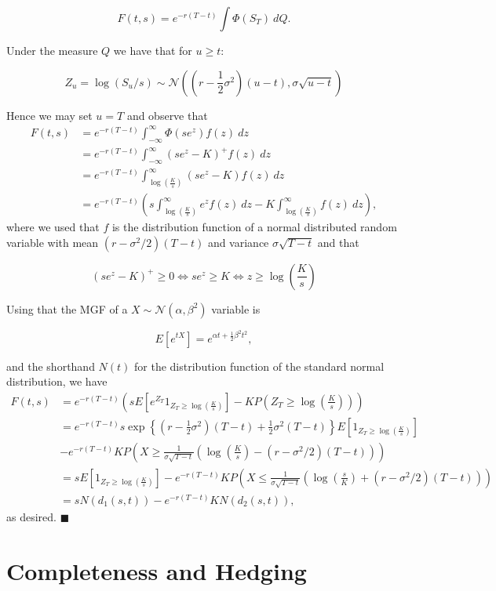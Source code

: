 \documentclass[a4paper,12pt,openany]{book}
\begin{document}
\[
F(t,s)=e^{-r(T-t)}\int \Phi(S_T)\ dQ.
\]

Under the measure \(Q\) we have that for \(u\ge t\):

\[
Z_u=\log (S_u/s)\sim \mathcal{N}\left(\left(r-\frac{1}{2}\sigma^2\right)(u-t),\sigma\sqrt{u-t}\right)
\]

Hence we may set \(u=T\) and observe that
\begin{align*}
F(t,s)&=e^{-r(T-t)}\int_{-\infty}^\infty \Phi(se^z) f(z)\ dz\\
&=e^{-r(T-t)}\int_{-\infty}^\infty (se^z-K)^+ f(z)\ dz\\
&=e^{-r(T-t)}\int_{\log\left(\frac{K}{s}\right)}^{\infty} (se^z-K) f(z)\ dz\\
&=e^{-r(T-t)}\left(s\int_{\log\left(\frac{K}{s}\right)}^{\infty} e^z f(z)\ dz-K\int_{\log\left(\frac{K}{s}\right)}^{\infty} f(z)\ dz\right),
\end{align*}
where we used that \(f\) is the distribution function of a normal distributed random variable with mean \((r-\sigma^2/2)(T-t)\) and variance \(\sigma\sqrt{T-t}\) and that

\[
(se^z-K)^+ \ge 0\iff se^z\ge K\iff z\ge \log\left(\frac{K}{s}\right)
\]

Using that the MGF of a \(X\sim\mathcal{N}(\alpha, \beta^2)\) variable is

\[
E[e^{tX}]=e^{\alpha t+\frac{1}{2}\beta ^2t^2},
\]

and the shorthand \(N(t)\) for the distribution function of the standard normal distribution, we have
\begin{align*}
F(t,s)&=e^{-r(T-t)}\left(sE\left[e^{Z_T}1_{Z_T\ge \log\left(\frac{K}{s}\right)}\right]-K P\left(Z_T\ge \log\left(\frac{K}{s}\right)\right)\right)\\
&=e^{-r(T-t)}s\exp\left\{\left(r-\frac{1}{2}\sigma^2\right)(T-t)+\frac{1}{2}\sigma^2(T-t)\right\}E\left[1_{Z_T\ge \log\left(\frac{K}{s}\right)}\right]\\
&-e^{-r(T-t)}K P\left(X\ge\frac{1}{\sigma\sqrt{T-t}}\left( \log\left(\frac{K}{s}\right)-(r-\sigma^2/2)(T-t)\right)\right)\\
&=sE\left[1_{Z_T\ge \log\left(\frac{K}{s}\right)}\right]-e^{-r(T-t)}K P\left(X\le\frac{1}{\sigma\sqrt{T-t}}\left(\log\left(\frac{s}{K}\right)+(r-\sigma^2/2)(T-t)\right)\right)\\
&=sN(d_1(s,t))-e^{-r(T-t)}K N\left(d_2(s,t)\right),
\end{align*}
as desired. \(\blacksquare\)

\hypertarget{completeness-and-hedging}{%
\section{Completeness and Hedging}\label{completeness-and-hedging}}
\end{document}
